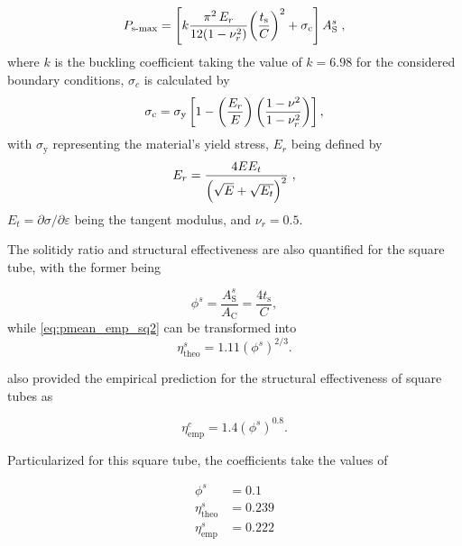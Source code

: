 \documentclass[12pt,number,preprint,review,times]{elsarticle}
\begin{document}
\begin{equation}
\centering
    P_{\mathrm{s{\text -}max}} = \left[ k \frac{\pi^2 \, E_r}{12 (1 - \nu_r^2)} {\left( {\frac{t_\mathrm{s}}{C}} \right)}^2  + \sigma_{\mathrm{c}} \right] {A^s_{\mathrm{S}}} \; , %
\label{eq:pmax_theo_sq}
\end{equation}
where $k$ is the buckling coefficient taking the value of $k = 6.98$ for the considered boundary conditions, $\sigma_c$ is calculated by
\begin{equation}
\centering
    \sigma_{\mathrm{c}} = \sigma_{\mathrm{y}} \left[ 1 - \left( {\frac{E_r}{E}} \right) \left( {\frac{1 - \nu^2}{1 - \nu_r^2}} \right) \right], 
\label{eq:pmax_sigma-c}
\end{equation}
with $\sigma_{\mathrm{y}}$ representing the material's yield stress, $E_r$ being defined by 
\begin{equation}
\centering
    E_r = \frac{4 E E_t}{\left( \sqrt{E} + \sqrt{E_t} \right)^2} \; , 
\label{eq:pmax_Er}
\end{equation}
$E_t = {\partial \sigma}/{\partial \varepsilon}$ being the tangent modulus, and $\nu_r = 0.5$.


The solitidy ratio and structural effectiveness are also quantified for the square tube, with the former being

\begin{equation}
\phi^s = \frac{{A^s_{\mathrm{S}}}}{A_\mathrm{C}} = \frac{4 t_\mathrm{s}}{C},
\end{equation}
while \cref{eq:pmean_emp_sq2} can be transformed into 
\begin{equation}
\eta_{\mathrm{theo}}^s = 1.11 {\left(\phi^s\right)}^{2/3}.
\end{equation}

\citet{thornton1983energy} also provided the empirical prediction for the structural effectiveness of square tubes as

\begin{equation}
\eta_{\mathrm{emp}}^c = 1.4 {\left(\phi^s\right)}^{0.8}.
\end{equation}

Particularized for this square tube, the coefficients take the values of

\begin{align}
\phi^s &= 0.1\\ 
\eta_{\mathrm{theo}}^s &= 0.239\\ 
\eta_{\mathrm{emp}}^s &=  0.222
\end{align}
\end{document}
